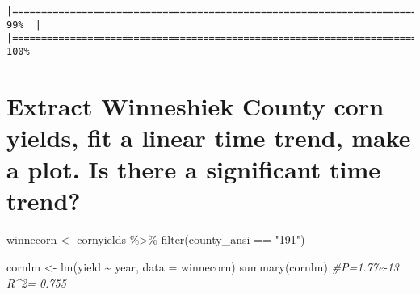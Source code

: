 \documentclass[
]{book}
\newenvironment{Shaded}{\begin{snugshade}}{\end{snugshade}}
\newcommand{\AttributeTok}[1]{\textcolor[rgb]{0.77,0.63,0.00}{#1}}
\newcommand{\CommentTok}[1]{\textcolor[rgb]{0.56,0.35,0.01}{\textit{#1}}}
\newcommand{\FunctionTok}[1]{\textcolor[rgb]{0.00,0.00,0.00}{#1}}
\newcommand{\NormalTok}[1]{#1}
\newcommand{\OtherTok}[1]{\textcolor[rgb]{0.56,0.35,0.01}{#1}}
\newcommand{\SpecialCharTok}[1]{\textcolor[rgb]{0.00,0.00,0.00}{#1}}
\newcommand{\StringTok}[1]{\textcolor[rgb]{0.31,0.60,0.02}{#1}}
\begin{document}
\begin{verbatim}
|======================================================================|  99%  |                                                                              |======================================================================| 100%
\end{verbatim}

\begin{Shaded}
\end{Shaded}

\hypertarget{extract-winneshiek-county-corn-yields-fit-a-linear-time-trend-make-a-plot.-is-there-a-significant-time-trend}{%
\section{Extract Winneshiek County corn yields, fit a linear time trend, make a plot. Is there a significant time trend?}\label{extract-winneshiek-county-corn-yields-fit-a-linear-time-trend-make-a-plot.-is-there-a-significant-time-trend}}

\begin{Shaded}
\begin{Highlighting}[]
\NormalTok{winnecorn }\OtherTok{\textless{}{-}}\NormalTok{ cornyields }\SpecialCharTok{\%\textgreater{}\%}
  \FunctionTok{filter}\NormalTok{(county\_ansi }\SpecialCharTok{==} \StringTok{"191"}\NormalTok{)}

\NormalTok{cornlm }\OtherTok{\textless{}{-}} \FunctionTok{lm}\NormalTok{(yield }\SpecialCharTok{\textasciitilde{}}\NormalTok{ year, }\AttributeTok{data =}\NormalTok{ winnecorn)}
\FunctionTok{summary}\NormalTok{(cornlm) }\CommentTok{\#P=1.77e{-}13 R\^{}2= 0.755}
\end{Highlighting}
\end{Shaded}
\end{document}

